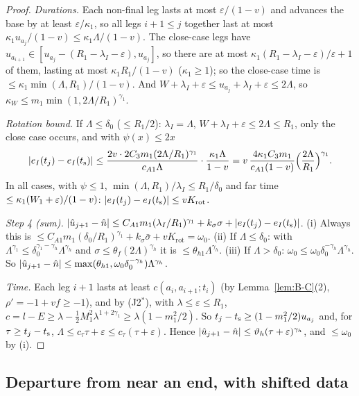 \begin{proof}
\emph{Durations.} Each non-final leg lasts at most $\varepsilon/(1-v)$ and advances the base by at least $\varepsilon/\kappa_1$, so
all legs $i+1\le j$ together last at most $\kappa_1u_{a_j}/(1-v)\le\kappa_1\Lambda/(1-v)$. The close-case legs have
$u_{a_{i+1}}\in[u_{a_j}-(R_1-\lambda_I-\varepsilon),u_{a_j}]$, so there are at most $\kappa_1(R_1-\lambda_I-\varepsilon)/\varepsilon+1$
of them, lasting at most $\kappa_1R_1/(1-v)$ ($\kappa_1\ge1$); so the close-case time is $\le\kappa_1\min(\Lambda,R_1)/(1-v)$. And
$W+\lambda_I+\varepsilon\le u_{a_j}+\lambda_I+\varepsilon\le2\Lambda$, so $\kappa_W\le m_1\min(1,2\Lambda/R_1)^{\gamma_1}$.

\emph{Rotation bound.} If $\Lambda\le\delta_0$ ($\le R_1/2$): $\lambda_I=\Lambda$, $W+\lambda_I+\varepsilon\le2\Lambda\le R_1$, only
the close case occurs, and with $\psi(x)\le2x$
\[
|e_I(t_j)-e_I(t_{\mathrm s})|\le\frac{2v\cdot2C_3m_1(2\Lambda/R_1)^{\gamma_1}}{c_{A1}\Lambda}\cdot\frac{\kappa_1\Lambda}{1-v}
=v\,\frac{4\kappa_1C_3m_1}{c_{A1}(1-v)}\Bigl(\frac{2\Lambda}{R_1}\Bigr)^{\gamma_1}.
\]
In all cases, with $\psi\le1$, $\min(\Lambda,R_1)/\lambda_I\le R_1/\delta_0$ and far time $\le\kappa_1(W_1+\varepsilon)/(1-v)$:
$|e_I(t_j)-e_I(t_{\mathrm s})|\le vK_{\mathrm{rot}}$.

\emph{Step 4 (sum).} $|\hat u_{j+1}-\hat n|\le C_{A1}m_1(\lambda_I/R_1)^{\gamma_1}+k_\sigma\sigma+|e_I(t_j)-e_I(t_{\mathrm s})|$.
(i) Always this is $\le C_{A1}m_1(\delta_0/R_1)^{\gamma_1}+k_\sigma\bar\sigma+vK_{\mathrm{rot}}=\omega_0$.
(ii) If $\Lambda\le\delta_0$: with $\Lambda^{\gamma_1}\le\delta_0^{\gamma_1-\gamma_h}\Lambda^{\gamma_h}$ and
$\sigma\le\theta_f(2\Lambda)^{\gamma_h}$ it is $\le\theta_{h1}\Lambda^{\gamma_h}$. (iii) If $\Lambda>\delta_0$:
$\omega_0\le\omega_0\delta_0^{-\gamma_h}\Lambda^{\gamma_h}$. So $|\hat u_{j+1}-\hat n|\le\max(\theta_{h1},\omega_0\delta_0^{-\gamma_h})\Lambda^{\gamma_h}$.

\emph{Time.} Each leg $i+1$ lasts at least $c(a_i,a_{i+1};t_i)$ (by Lemma~\ref{lem:B-C}(2), $\rho'=-1+vf\ge-1$), and by
(J2$^*$), with $\lambda\le\varepsilon\le R_1$, $c=l-E\ge\lambda-\frac12M_1^2\lambda^{1+2\gamma_1}\ge\lambda(1-m_1^2/2)$. So
$t_j-t_{\mathrm s}\ge(1-m_1^2/2)u_{a_j}$ and, for $\tau\ge t_j-t_{\mathrm s}$, $\Lambda\le c_\tau\tau+\varepsilon\le c_\tau(\tau+\varepsilon)$. Hence
$|\hat u_{j+1}-\hat n|\le\vartheta_h(\tau+\varepsilon)^{\gamma_h}$, and $\le\omega_0$ by (i).
\end{proof}

\subsection{Departure from near an end, with shifted data}

